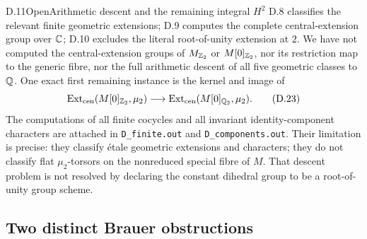 \begin{statement}{D.11}{Open}{Arithmetic descent and the remaining integral \(H^2\)}
D.8 classifies the relevant finite geometric extensions;
D.9 computes the complete central-extension group over \(\mathbb C\);
D.10 excludes the literal root-of-unity extension at \(2\).
We have not computed
the central-extension groups of \(M_{\mathbb Z_2}\) or \(M[0]_{\mathbb Z_2}\),
nor its restriction map to the generic fibre, nor the full
arithmetic descent of all five geometric classes to \(\mathbb Q\).
One exact first remaining instance is the kernel and image of
\[
 \operatorname{Ext}_{\mathrm{cen}}(M[0]_{\mathbb Z_2},\mu _2)
 \longrightarrow
 \operatorname{Ext}_{\mathrm{cen}}(M[0]_{\mathbb Q_2},\mu _2).
 \tag{D.23}
\]
The computations of all finite cocycles and all invariant
identity-component characters are attached in
\texttt{D\_finite.out} and \texttt{D\_components.out}.
Their limitation is precise: they classify étale geometric
extensions and characters; they do not classify flat
\(\mu _2\)-torsors on the nonreduced special fibre of \(M\).
That descent problem is not resolved by declaring the
constant dihedral group to be a root-of-unity group scheme.
\end{statement}

\subsection{Two distinct Brauer obstructions}

